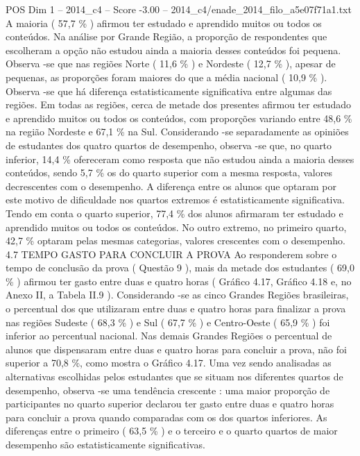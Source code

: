 \begin{textsample}{POS Dim 1 – 2014\_c4 – Score -3.00 – 2014\_c4/enade\_2014\_filo\_a5e07f71a1.txt}
A maioria ( 57,7 \% ) afirmou ter estudado e aprendido muitos ou todos os conteúdos.
Na análise por Grande Região, a proporção de respondentes que escolheram a opção não estudou ainda a maioria desses conteúdos foi pequena.
Observa -se que nas regiões Norte ( 11,6 \% ) e Nordeste ( 12,7 \% ), apesar de pequenas, as proporções foram maiores do que a média nacional ( 10,9 \% ).
Observa -se que há diferença estatisticamente significativa entre algumas das regiões.
Em todas as regiões, cerca de metade dos presentes afirmou ter estudado e aprendido muitos ou todos os conteúdos, com proporções variando entre 48,6 \% na região Nordeste e 67,1 \% na Sul.
Considerando -se separadamente as opiniões de estudantes dos quatro quartos de desempenho, observa -se que, no quarto inferior, 14,4 \% ofereceram como resposta que não estudou ainda a maioria desses conteúdos, sendo 5,7 \% os do quarto superior com a mesma resposta, valores decrescentes com o desempenho.
A diferença entre os alunos que optaram por este motivo de dificuldade nos quartos extremos é estatisticamente significativa.
Tendo em conta o quarto superior, 77,4 \% dos alunos afirmaram ter estudado e aprendido muitos ou todos os conteúdos.
No outro extremo, no primeiro quarto, 42,7 \% optaram pelas mesmas categorias, valores crescentes com o desempenho. 4.7 TEMPO GASTO PARA CONCLUIR A PROVA Ao responderem sobre o tempo de conclusão da prova ( Questão 9 ), mais da metade dos estudantes ( 69,0 \% ) afirmou ter gasto entre duas e quatro horas ( Gráfico 4.17, Gráfico 4.18 e, no Anexo II, a Tabela II.9 ).
Considerando -se as cinco Grandes Regiões brasileiras, o percentual dos que utilizaram entre duas e quatro horas para finalizar a prova nas regiões Sudeste ( 68,3 \% ) e Sul ( 67,7 \% ) e Centro-Oeste ( 65,9 \% ) foi inferior ao percentual nacional.
Nas demais Grandes Regiões o percentual de alunos que dispensaram entre duas e quatro horas para concluir a prova, não foi superior a 70,8 \%, como mostra o Gráfico 4.17.
Uma vez sendo analisadas as alternativas escolhidas pelos estudantes que se situam nos diferentes quartos de desempenho, observa -se uma tendência crescente : uma maior proporção de participantes no quarto superior declarou ter gasto entre duas e quatro horas para concluir a prova quando comparadas com os dos quartos inferiores.
As diferenças entre o primeiro ( 63,5 \% ) e o terceiro e o quarto quartos de maior desempenho são estatisticamente significativas.

\end{textsample}
